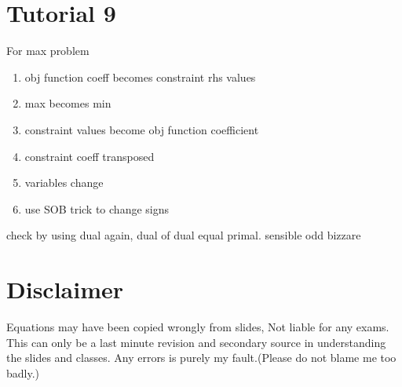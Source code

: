 \documentclass{article}
\begin{document}
\section{Tutorial 9}
For max problem
\begin{enumerate}
  \item obj function coeff becomes constraint rhs values
  \item max becomes min
  \item constraint values become obj function coefficient
  \item constraint coeff transposed
  \item variables change
  \item use SOB trick to change signs
\end{enumerate}
check by using dual again, dual of dual equal primal.
sensible odd bizzare
\section{Disclaimer}
Equations may have been copied wrongly from slides, Not liable for any exams. This can only be a last minute revision and secondary source in understanding the slides and classes. Any errors is purely my fault.(Please do not blame me too badly.)
\end{document}
